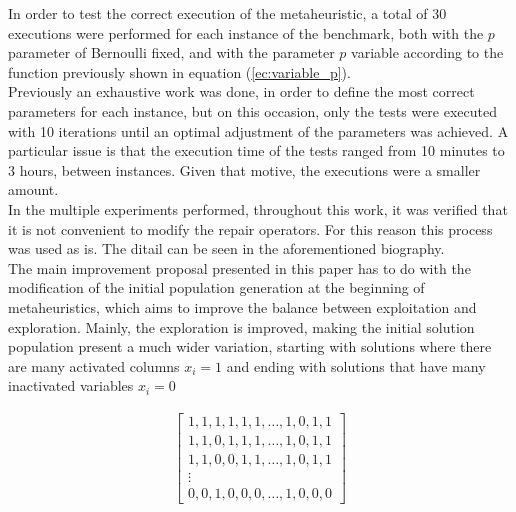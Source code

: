 In order to test the correct execution of the metaheuristic, a total of 30 executions were performed for each instance of the benchmark, both with the $p$ parameter of Bernoulli fixed, and with the parameter $p$ variable according to the function previously shown in equation (\ref{ec:variable_p}).\\

Previously an exhaustive work was done, in order to define the most correct parameters for each instance, but on this occasion, only the tests were executed with 10 iterations until an optimal adjustment of the parameters was achieved. A particular issue is that the execution time of the tests ranged from 10 minutes to 3 hours, between instances. Given that motive, the executions were a smaller amount.\\

In the multiple experiments performed, throughout this work, it was verified that it is not convenient to modify the repair operators. For this reason this 
process was used as is. The ditail can be seen in the aforementioned biography.\\

The main improvement proposal presented in this paper has to do with the modification of the initial population generation at the beginning of metaheuristics, which aims to improve the balance between exploitation and exploration. Mainly, the exploration is improved, making the initial solution population present a much wider variation, starting with solutions where there are many activated columns $x_i = 1$ and ending with solutions that have many inactivated variables $x_i = 0$

\begin{align}
    	\begin{bmatrix}  1,1,1,1,1,1, \ldots,1,0,1,1\\
    			     	1,1,0,1,1,1, \ldots,1,0,1,1 \\ 
                              	1,1,0,0,1,1, \ldots, 1,0,1,1 \\
				\vdots \\
    			     	0,0,1,0,0,0, \ldots,1,0,0,0 
	\end{bmatrix}
\end{align}